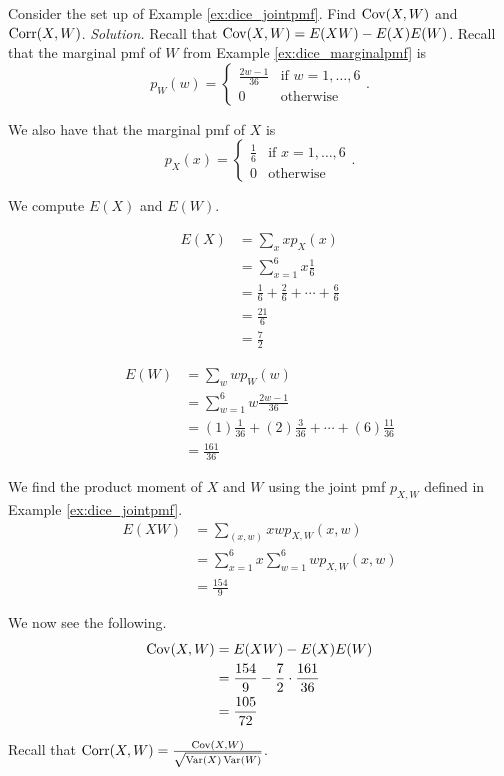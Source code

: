 \begin{example}[]
	Consider the set up of Example \ref{ex:dice_jointpmf}. Find $\operatorname{Cov}(X,W)$ and $\operatorname{Corr}(X,W)$.
	\textit{Solution.} Recall that $\operatorname{Cov}(X,W)=E(XW)-E(X)E(W)$.
	Recall that the marginal pmf of $W$ from Example \ref{ex:dice_marginalpmf} is $$p_W(w)=\begin{cases}
		\frac{2w-1}{36} & \text{if $w=1,\hdots, 6$}\\
		0 & \text{otherwise}
	\end{cases}.$$

	We also have that the marginal pmf of $X$ is $$p_X(x)=\begin{cases}
		\frac 16 & \text{if $x=1,\hdots, 6$}\\
		0 & \text{otherwise}\end{cases}.$$

	We compute $E(X)$ and $E(W)$.

	\begin{align*}
		E(X)&=\sum_xxp_X(x)\\
		&=\sum_{x=1}^6x\frac 16\\
		&=\frac 16+\frac 26+\cdots+\frac 66\\
		&=\frac{21}6\\
		&=\frac 72
	\end{align*}

	\begin{align*}
		E(W)&=\sum_wwp_W(w)\\
		&=\sum_{w=1}^6w\frac{2w-1}{36}\\
		&=(1)\frac{1}{36}+(2)\frac{3}{36}+\cdots+(6)\frac{11}{36}\\
		&=\frac{161}{36}
	\end{align*}

	We find the product moment of $X$ and $W$ using the joint pmf $p_{X,W}$ defined in Example \ref{ex:dice_jointpmf}.
	\begin{align*}
		E(XW)&=\sum_{(x,w)}xwp_{X,W}(x,w)\\
		&=\sum_{x=1}^6x\sum_{w=1}^6wp_{X,W}(x,w)\\
		&=\frac{154}{9}
	\end{align*}

	We now see the following.
	\begin{align*}
		\operatorname{Cov}(X,W)&=E(XW)-E(X)E(W)\\
		&=\frac{154}{9}-\frac 72\cdot\frac{161}{36}\\
		&=\frac{105}{72}
	\end{align*}

	Recall that $\operatorname{Corr}(X,W)=\frac{\operatorname{Cov}(X,W)}{\sqrt{\operatorname{Var}(X)\operatorname{Var}(W)}}$.


\end{example}
